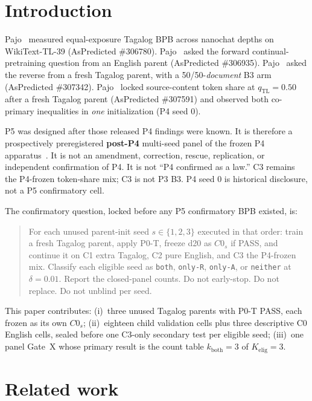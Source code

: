 \documentclass[11pt,a4paper]{article}
\begin{document}
\section{Introduction}
\label{sec:intro}

Pajo~\cite{pajo2026p11} measured equal-exposure Tagalog BPB across nanochat depths on WikiText-TL-39 (AsPredicted \#306780). Pajo~\cite{pajo2026p2} asked the forward continual-pretraining question from an English parent (AsPredicted \#306935). Pajo~\cite{pajo2026p3} asked the reverse from a fresh Tagalog parent, with a 50/50-\emph{document} B3 arm (AsPredicted \#307342). Pajo~\cite{pajo2026p4} locked source-content token share at $q_{\mathrm{TL}}=0.50$ after a fresh Tagalog parent (AsPredicted \#307591) and observed both co-primary inequalities in \emph{one} initialization (P4 seed 0).

P5 was designed after those released P4 findings were known. It is therefore a prospectively preregistered \textbf{post-P4} multi-seed panel of the frozen P4 apparatus~\cite{aspredicted307836}. It is not an amendment, correction, rescue, replication, or independent confirmation of P4. It is not ``P4 confirmed as a law.'' C3 remains the P4-frozen token-share mix; C3 is not P3 B3. P4 seed 0 is historical disclosure, not a P5 confirmatory cell.

The confirmatory question, locked before any P5 confirmatory BPB existed, is:

\begin{quote}
For each unused parent-init seed $s\in\{1,2,3\}$ executed in that order: train a fresh Tagalog parent, apply P0-T, freeze d20 as $C0_s$ if PASS, and continue it on C1 extra Tagalog, C2 pure English, and C3 the P4-frozen mix. Classify each eligible seed as \texttt{both}, \texttt{only-R}, \texttt{only-A}, or \texttt{neither} at $\delta=0.01$. Report the closed-panel counts. Do not early-stop. Do not replace. Do not unblind per seed.
\end{quote}

This paper contributes: (i)~three unused Tagalog parents with P0-T PASS, each frozen as its own $C0_s$; (ii)~eighteen child validation cells plus three descriptive C0 English cells, sealed before one C3-only secondary test per eligible seed; (iii)~one panel Gate~X whose primary result is the count table $k_{\mathrm{both}}=3$ of $K_{\mathrm{elig}}=3$.

\section{Related work}
\label{sec:related}
\end{document}
